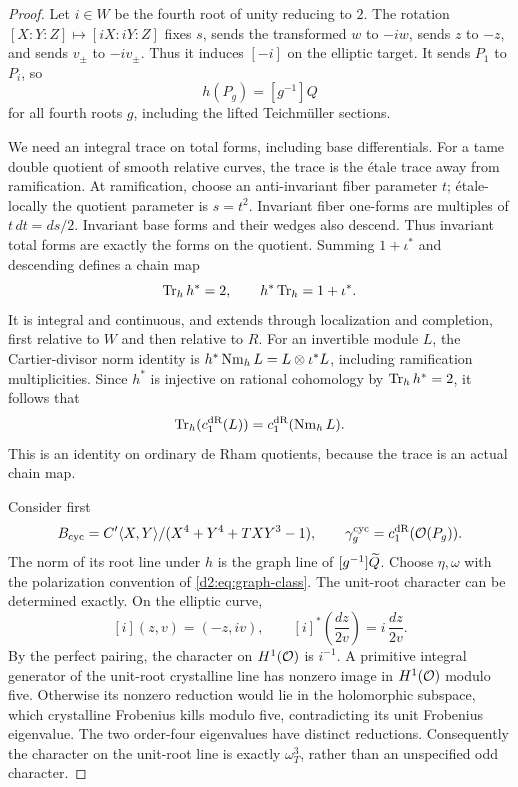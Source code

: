 \begin{proof}
Let \(i\in W\) be the fourth root of unity reducing to \(2\).
The rotation
\([X:Y:Z]\mapsto[iX:iY:Z]\) fixes \(s\), sends the transformed
\(w\) to \(-iw\), sends \(z\) to \(-z\), and sends \(v_\pm\) to
\(-iv_\pm\).
Thus it induces \([-i]\) on the elliptic target.
It sends \(P_1\) to \(P_i\), so
\begin{equation}\label{d2:eq:root-equivariance}
 h(P_g)=[g^{-1}]Q
\end{equation}
for all fourth roots \(g\), including the lifted Teichm\"uller
sections.

We need an integral trace on total forms, including base
differentials.
For a tame double quotient of smooth relative curves, the trace is
the \'etale trace away from ramification.
At ramification, choose an anti-invariant fiber parameter \(t\);
\'etale-locally the quotient parameter is \(s=t^2\).
Invariant fiber one-forms are multiples of
\(t\,dt=ds/2\).
Invariant base forms and their wedges also descend.
Thus invariant total forms are exactly the forms on the quotient.
Summing \(1+\iota^*\) and descending defines a chain map
\[
 \operatorname{Tr}_hh^*=2,\qquad h^*\operatorname{Tr}_h=1+\iota^*.
\]
It is integral and continuous, and extends through localization and
completion, first relative to \(W\) and then relative to \(R\).
For an invertible module \(L\), the Cartier-divisor norm identity is
\(h^*\operatorname{Nm}_hL=L\otimes\iota^*L\), including ramification
multiplicities.
Since \(h^*\) is injective on rational cohomology by
\(\operatorname{Tr}_hh^*=2\), it follows that
\begin{equation}\label{d2:eq:trace-chern}
 \operatorname{Tr}_h(c_1^{\mathrm{dR}}(L))=c_1^{\mathrm{dR}}(\operatorname{Nm}_hL).
\end{equation}
This is an identity on ordinary de Rham quotients, because the trace
is an actual chain map.

Consider first
\[
 B_{\mathrm{cyc}}=
 C'\langle X,Y\rangle/(X^4+Y^4+TXY^3-1),
 \qquad
 \gamma_g^{\mathrm{cyc}}=c_1^{\mathrm{dR}}(\mathcal O(P_g)).
\]
The norm of its root line under \(h\) is the graph line of
\([g^{-1}]\widetilde Q\).
Choose \(\eta,\omega\) with the polarization convention of
\eqref{d2:eq:graph-class}.
The unit-root character can be determined exactly.
On the elliptic curve,
\[
 [i](z,v)=(-z,iv),\qquad
 [i]^*\!\left(\frac{dz}{2v}\right)
       =i\,\frac{dz}{2v}.
\]
By the perfect pairing, the character on \(H^1(\mathcal O)\) is
\(i^{-1}\).
A primitive integral generator of the unit-root crystalline line
has nonzero image in \(H^1(\mathcal O)\) modulo five.
Otherwise its nonzero reduction would lie in the holomorphic
subspace, which crystalline Frobenius kills modulo five,
contradicting its unit Frobenius eigenvalue.
The two order-four eigenvalues have distinct reductions.
Consequently the character on the unit-root line is exactly
\(\omega_T^3\), rather than an unspecified odd character.


\end{proof}
